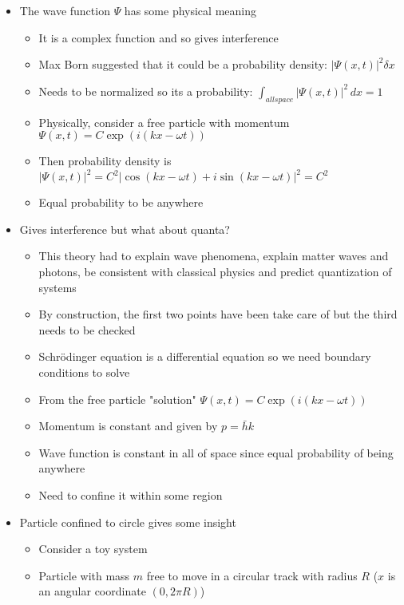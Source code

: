 \documentclass[12pt]{article}
\begin{document}
\begin{itemize}
\begin{itemize}
    \end{itemize}
    \item The wave function $\varPsi$ has some physical meaning \begin{itemize}
        \item It is a complex function and so gives interference
        \item Max Born suggested that it could be a probability density: $| \varPsi(x,t) |^2 \delta x$
        \item Needs to be normalized so its a probability: $\int_{all space} | \varPsi(x,t) |^2 \, dx = 1$
        \item Physically, consider a free particle with momentum $\varPsi(x,t) = C \exp (i(kx-\omega t))$
        \item Then probability density is $| \varPsi(x,t)|^2 = C^2 | \cos(kx - \omega t) + i \sin(kx - \omega t) |^2 = C^2$
        \item Equal probability to be anywhere
    \end{itemize}
    \item Gives interference but what about quanta? \begin{itemize}
        \item This theory had to explain wave phenomena, explain matter waves and photons, be consistent with classical physics and predict quantization of systems
        \item By construction, the first two points have been take care of but the third needs to be checked
        \item Schr\"{o}dinger equation is a differential equation so we need boundary conditions to solve 
        \item From the free particle "solution" $\varPsi (x,t) = C \exp(i(kx-\omega t))$
        \item Momentum is constant and given by $p = \bar{h} k$
        \item Wave function is constant in all of space since equal probability of being anywhere
        \item Need to confine it within some region
    \end{itemize}
    \item Particle confined to circle gives some insight \begin{itemize}
        \item Consider a toy system
        \item Particle with mass $m$ free to move in a circular track with radius $R$ ($x$ is an angular coordinate $(0, 2 \pi R)$)

\end{itemize}
\end{itemize}
\end{document}
